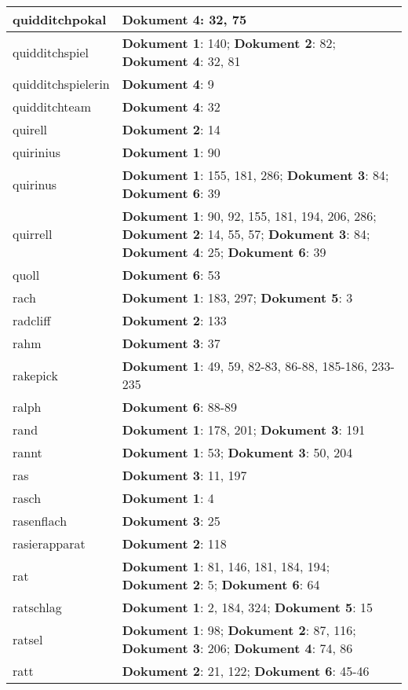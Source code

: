 \documentclass[a5paper]{article}
\begin{document}
\begin{longtable}[l]{|l|p{3in}|}
\hline
quidditchpokal & \textbf{Dokument 4}: 32, 75 \\
\hline
quidditchspiel & \textbf{Dokument 1}: 140; \textbf{Dokument 2}: 82; \textbf{Dokument 4}: 32, 81 \\
\hline
quidditchspielerin & \textbf{Dokument 4}: 9 \\
\hline
quidditchteam & \textbf{Dokument 4}: 32 \\
\hline
quirell & \textbf{Dokument 2}: 14 \\
\hline
quirinius & \textbf{Dokument 1}: 90 \\
\hline
quirinus & \textbf{Dokument 1}: 155, 181, 286; \textbf{Dokument 3}: 84; \textbf{Dokument 6}: 39 \\
\hline
quirrell & \textbf{Dokument 1}: 90, 92, 155, 181, 194, 206, 286; \textbf{Dokument 2}: 14, 55, 57; \textbf{Dokument 3}: 84; \textbf{Dokument 4}: 25; \textbf{Dokument 6}: 39 \\
\hline
quoll & \textbf{Dokument 6}: 53 \\
\hline
rach & \textbf{Dokument 1}: 183, 297; \textbf{Dokument 5}: 3 \\
\hline
radcliff & \textbf{Dokument 2}: 133 \\
\hline
rahm & \textbf{Dokument 3}: 37 \\
\hline
rakepick & \textbf{Dokument 1}: 49, 59, 82-83, 86-88, 185-186, 233-235 \\
\hline
ralph & \textbf{Dokument 6}: 88-89 \\
\hline
rand & \textbf{Dokument 1}: 178, 201; \textbf{Dokument 3}: 191 \\
\hline
rannt & \textbf{Dokument 1}: 53; \textbf{Dokument 3}: 50, 204 \\
\hline
ras & \textbf{Dokument 3}: 11, 197 \\
\hline
rasch & \textbf{Dokument 1}: 4 \\
\hline
rasenflach & \textbf{Dokument 3}: 25 \\
\hline
rasierapparat & \textbf{Dokument 2}: 118 \\
\hline
rat & \textbf{Dokument 1}: 81, 146, 181, 184, 194; \textbf{Dokument 2}: 5; \textbf{Dokument 6}: 64 \\
\hline
ratschlag & \textbf{Dokument 1}: 2, 184, 324; \textbf{Dokument 5}: 15 \\
\hline
ratsel & \textbf{Dokument 1}: 98; \textbf{Dokument 2}: 87, 116; \textbf{Dokument 3}: 206; \textbf{Dokument 4}: 74, 86 \\
\hline
ratt & \textbf{Dokument 2}: 21, 122; \textbf{Dokument 6}: 45-46 \\

\end{longtable}
\end{document}
